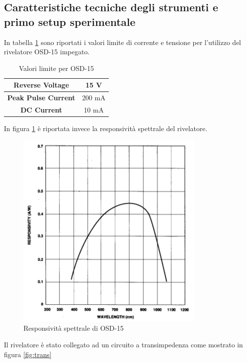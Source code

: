 \documentclass[10pt,letterpaper]{article}
\begin{document}
\subsection{Caratteristiche tecniche degli strumenti e primo setup sperimentale}

In tabella \ref{tab:osd} sono riportati i valori limite di corrente e tensione per l'utilizzo del rivelatore OSD-15 impegato.

\begin{table}[htp]
\centering
\caption{Valori limite per  OSD-15}
\label{tab:osd}
\begin{tabular}{c|c}
\textbf{Reverse Voltage} & 15 V \\ 
\hline 
\textbf{Peak Pulse Current} & 200 mA	 \\ 
\hline 
\textbf{DC Current} & 10 mA \\ 
\end{tabular} 
\end{table}

In figura \ref{fig:responsivity} è riportata invece la responsività spettrale del rivelatore.

\begin{figure}[htp]
\centering
\includegraphics[scale=.45]{responsivity}
\caption{Responsività spettrale di OSD-15}
\label{fig:responsivity}
\end{figure}

Il rivelatore è stato collegato ad un circuito a transimpedenza come mostrato in figura \ref{fig:trans}
\end{document}
